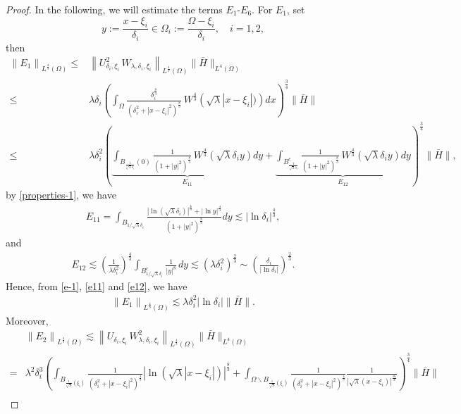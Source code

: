 \documentclass[a4paper,reqno,11pt,oneside]{amsart}
\numberwithin{equation}{section}
\begin{document}
\begin{proof}
In the following, we will estimate the terms $E_1$-$E_6$. For $E_1$, set $$y:=\frac{x-\xi_i}{\delta_i}\in \Omega_i:=\frac{\Omega-\xi_i}{\delta_i},\quad i=1,2,$$ then 
{\small
\begin{align}\label{e-1}
    \left\|E_1\right\|_{L^{\frac{4}{3}}(\Omega)}\leq &\left\|U_{ {\delta_i}, {\xi_i}}^2\,W_{\lambda,\delta_i,\xi_i}\right\|_{L^{\frac{4}{3}}(\Omega)}\|\bar H\|_{L^{4}(\Omega)}\nonumber\\
    \leq&\lambda\delta_i\left(\displaystyle \int_{\Omega}\frac{\delta_i^{\frac{8}{3}}}{\left( \delta_i^2+|x-\xi_i|^2 \right)^{\frac{8}{3}}}\,W^{\frac{4}{3}}\left( \sqrt{\lambda}|x-\xi_i|) \right) dx\right)^{\frac{3}{4}}\|\bar H\|\nonumber\\
\leq& \lambda\delta_i^{{2}}\left({\underbrace{\displaystyle \int_{B_{\frac{1}{\sqrt{\lambda}\delta_i}}(0)}\frac{1}{\left( 1+|y|^2 \right)^{\frac{8}{3}}}\,W^{\frac{4}{3}}\left( \sqrt{\lambda}\delta_i y \right) dy}_{E_{11}}+\underbrace{\displaystyle \int_{B^{c}_{\frac{1}{\sqrt{\lambda}\delta_i}}}\frac{1}{\left( 1+|y|^2 \right)^{\frac{8}{3}}}\,W^{\frac{4}{3}}\left( \sqrt{\lambda}\delta_i y \right) dy}_{E_{12}}}\right)^{\frac{3}{4}}\|\bar H\|,
\end{align}}
by \ref{properties-1}, we have \begin{align}\label{e11}
    E_{11}=\displaystyle \int_{B_{{1}/{\sqrt{\lambda}\delta_i}}}\frac{|\ln{ (\sqrt{\lambda}\delta_i)}|^{\frac{4}{3}}+|\ln{ y}|^{\frac{4}{3}}}{\left( 1+|y|^2 \right)^{\frac{8}{3}}}dy\lesssim|\ln{\delta_i}|^{\frac{4}{3}},
\end{align}
and
\begin{align}\label{e12}
E_{12}
\lesssim 
\left(\frac{1}{\lambda\delta_i^2}\right)^{\frac{4}{3}}
\int_{B^c_{{1}/{\sqrt{\lambda}\delta_i}}}
\frac{1}{|y|^{8}}
\, dy\lesssim\left({\lambda\delta_i^2}\right)^{\frac{2}{3}}\sim \left(\frac{\delta_i}{|\ln{\delta_i}|}\right)^{\frac{2}{3}}.
\end{align}
Hence, from \eqref{e-1}, \eqref{e11} and \eqref{e12}, we have
\begin{align*}
    \left\|E_1\right\|_{L^{\frac{4}{3}}(\Omega)}\lesssim \lambda\delta_i^{{2}}|\ln{\delta_i}|\|\bar H\|.
\end{align*}
Moreover,
{\small
\begin{align*}
&\left\|E_2\right\|_{L^{\frac{4}{3}}(\Omega)}\lesssim \left\|U_{ {\delta_i}, {\xi_i}}\,W^2_{\lambda,\delta_i,\xi_i}\right\|_{L^{\frac{4}{3}}(\Omega)}\|\bar H\|_{L^{4}(\Omega)}\nonumber\\
=&\lambda^{{2}}\delta_i^{{3}}\left({\displaystyle \int_{B_{\frac{1}{\sqrt{\lambda}}(\xi_i)}}\frac{1}{\left( \delta_i^2+|x-\xi_i|^2 \right)^{\frac{4}{3}}}\left|\ln{\left( \sqrt{\lambda}\left|x-\xi_i\right| \right) }\right|^{\frac{8}{3}}+\displaystyle \int_{\Omega\backslash B_{\frac{1}{\sqrt{\lambda}}(\xi_i)}}\frac{1}{\left( \delta_i^2+|x-\xi_i|^2 \right)^{\frac{4}{3}}}\frac{1}{\left|\sqrt{\lambda}\left(x-\xi_i\right) \right|^{\frac{16}{3}} }}\right)^{\frac{3}{4}}\|\bar H\|\nonumber\\

\end{align*}}
\end{proof}
\end{document}
